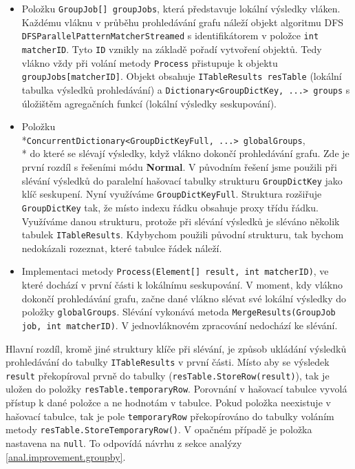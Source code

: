\begin{itemize}

\item Položku \texttt{GroupJob[] groupJobs}, která představuje lokální výsledky vláken.
Každému vláknu v průběhu prohledávání grafu náleží objekt algoritmu DFS \texttt{DFSParallelPatternMatcherStreamed} s identifikátorem v položce \texttt{int matcherID}.
Tyto \texttt{ID} vznikly na základě pořadí vytvoření objektů. 
Tedy vlákno vždy při volání metody \texttt{Process} přistupuje k objektu \texttt{groupJobs[matcherID]}.
Objekt obsahuje \texttt{ITableResults resTable} (lokální tabulka výsledků prohledávání) a \texttt{Dictionary<GroupDictKey, ...> groups} s úložištěm agregačních funkcí (lokální výsledky seskupování).

\item Položku \\*\texttt{ConcurrentDictionary<GroupDictKeyFull, ...> globalGroups},\\* do které se slévají výsledky, když vlákno dokončí prohledávání grafu.
Zde je první rozdíl s řešeními módu \textbf{Normal}.
V původním řešení jsme použili při slévání výsledků do paralelní hašovací tabulky strukturu \texttt{GroupDictKey} jako klíč seskupení.
Nyní využíváme \texttt{GroupDictKeyFull}.
Struktura rozšiřuje \texttt{GroupDictKey} tak, že místo indexu řádku obsahuje proxy třídu řádku.
Využíváme danou strukturu, protože při slévání výsledků je sléváno několik tabulek \texttt{ITableResults}.
Kdybychom použili původní strukturu, tak bychom nedokázali rozeznat, které tabulce řádek náleží.

\item Implementaci metody \texttt{Process(Element[] result, int matcherID)}, ve které dochází v první části k lokálnímu seskupování.
V moment, kdy vlákno dokončí prohledávání grafu, začne dané vlákno slévat své lokální výsledky do položky \texttt{globalGroups}.
Slévání vykonává metoda \texttt{MergeResults(GroupJob job, int matcherID)}.
V jednovláknovém zpracování nedochází ke slévání.
\end{itemize}
Hlavní rozdíl, kromě jiné struktury klíče při slévání, je způsob ukládání výsledků prohledávání do tabulky \texttt{ITableResults} v první části.
Místo aby se výsledek \texttt{result} překopíroval prvně do tabulky (\texttt{resTable.StoreRow(result)}), tak je uložen do položky \texttt{resTable.temporaryRow}.
Porovnání v hašovací tabulce vyvolá přístup k dané položce a ne hodnotám v tabulce.
Pokud položka neexistuje v hašovací tabulce, tak je pole \texttt{temporaryRow} překopírováno do tabulky voláním metody \texttt{resTable.StoreTemporaryRow()}.
V opačném případě je položka nastavena na \texttt{null}. To odpovídá návrhu z sekce analýzy \ref{anal.improvement.groupby}. 

